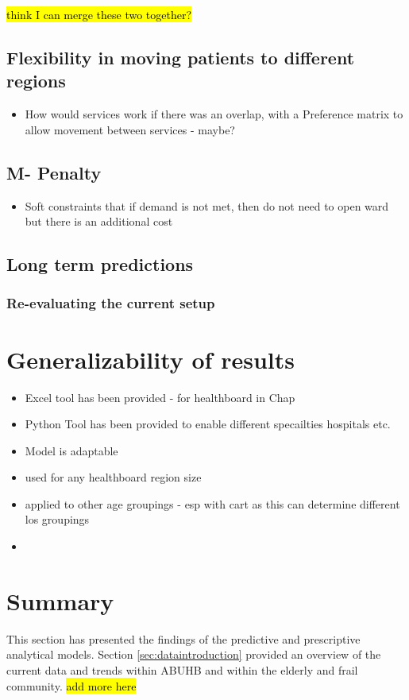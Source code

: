 \documentclass[../thesis.tex]{subfiles}
\begin{document}
\hl{think I can merge these two together?}
\subsection{Flexibility in moving patients to different regions}
\begin{itemize}
    \item How would services work if there was an overlap, with a Preference matrix to allow movement between services - maybe? 
\end{itemize}
\subsection{M- Penalty}
\begin{itemize}
    \item Soft constraints that if demand is not met, then do not need to open ward but there is an additional cost
\end{itemize}
\subsection{Long term predictions}
\subsubsection{Re-evaluating the current setup}




\section{Generalizability of results}
\begin{itemize}
\item Excel tool has been provided - for healthboard in Chap
\item Python Tool has been provided to enable different specailties  hospitals etc.
    \item Model is adaptable
    \item used for any healthboard region size
    \item applied to other age groupings - esp with cart as this can determine different los groupings
    \item 
\end{itemize}


\section{Summary}
This section has presented the findings of the predictive and prescriptive analytical models. Section \ref{sec:dataintroduction} provided an overview of the current data and trends within ABUHB and within the elderly and frail community. 
\hl{add more here}
\end{document}
